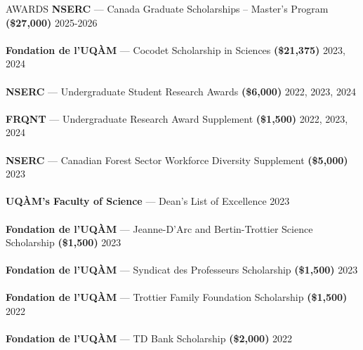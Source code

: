 \documentclass[
	11pt, %
]{resume} %
\begin{document}
\begin{rSection}{AWARDS}	
	\textbf{NSERC} — Canada Graduate Scholarships – Master’s Program \textbf{(\$27,000)} \hfill 2025-2026 \\
	\vspace{-2ex}\\
	\textbf{Fondation de l’UQÀM} — Cocodet Scholarship in Sciences \textbf{(\$21,375)} \hfill 2023, 2024 \\
	\vspace{-2ex}\\
	\textbf{NSERC} — Undergraduate Student Research Awards \textbf{(\$6,000)} \hfill 2022, 2023, 2024 \\ 
	\vspace{-2ex}\\
	\textbf{FRQNT} — Undergraduate Research Award Supplement \textbf{(\$1,500)} \hfill 2022, 2023, 2024 \\ 
	\vspace{-2ex}\\
	\textbf{NSERC} — Canadian Forest Sector Workforce Diversity Supplement \textbf{(\$5,000)} \hfill 2023 \\ 
	\vspace{-2ex}\\
	\textbf{UQÀM's Faculty of Science} — Dean’s List of Excellence \hfill 2023 \\ 
	\vspace{-2ex}\\
	\textbf{Fondation de l’UQÀM} — Jeanne-D’Arc and Bertin-Trottier Science Scholarship \textbf{(\$1,500)} \hfill 2023 \\ 
	\vspace{-2ex}\\
	\textbf{Fondation de l’UQÀM} — Syndicat des Professeurs Scholarship \textbf{(\$1,500)} \hfill 2023 \\ 
	\vspace{-2ex}\\
	\textbf{Fondation de l’UQÀM} — Trottier Family Foundation Scholarship \textbf{(\$1,500)} \hfill 2022 \\ 
	\vspace{-2ex}\\
	\textbf{Fondation de l’UQÀM} — TD Bank Scholarship \textbf{(\$2,000)} \hfill 2022 
\end{rSection}
\end{document}
